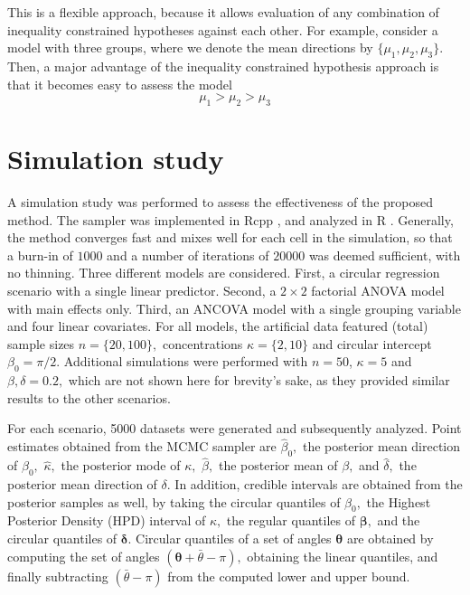 \documentclass[11pt,a4paper]{article}\usepackage[]{graphicx}\usepackage[]{color}
\newcommand{\bt}{\boldsymbol{\theta}}
\newcommand{\bdt}{\boldsymbol{\delta}}
\newcommand{\bbt}{\boldsymbol{\beta}}
\begin{document}
This is a flexible approach, because it allows evaluation of any combination of inequality constrained hypotheses against each other. For example, consider a model with three groups, where we denote the mean directions by \( \{ \mu_1, \mu_2, \mu_3 \} \). Then, a major advantage of the inequality constrained hypothesis approach is that it becomes easy to assess the model
\begin{equation}
\mu_1 > \mu_2 > \mu_3
\end{equation}

\section{Simulation study}

\label{sim}

A simulation study was performed to assess the effectiveness of the proposed method. The sampler was implemented in Rcpp \citep{rcpp}, and analyzed in R \citep{r2016}.  Generally, the method converges fast and mixes well for each cell in the simulation, so that a burn-in of \(1000\) and a number of iterations of \( 20000 \) was deemed sufficient, with no thinning.
Three different models are considered. First, a circular regression scenario with a single linear predictor. Second, a \( 2 \times 2 \) factorial ANOVA model with main effects only. Third, an ANCOVA model with a single grouping variable and four linear covariates.  For all models, the artificial data featured (total) sample sizes \( n = \{ 20, 100 \},\) concentrations \( \kappa = \{ 2, 10 \}\) and circular intercept \( \beta_0 = \pi/2.\) Additional simulations were performed with \( n = 50 \), \( \kappa = 5 \) and \( \beta, \delta = 0.2,\) which are not shown here for brevity's sake, as they provided similar results to the other scenarios.

For each scenario, 5000 datasets were generated and subsequently analyzed. Point estimates obtained from the MCMC sampler are \( \hat{\beta}_0,\) the posterior mean direction of \(\beta_0, \) \( \hat{\kappa},\) the posterior mode of \( \kappa,\) \( \hat{\beta},\) the posterior mean of \( \beta,\) and \( \hat{\delta},\) the posterior mean direction of \( \delta.\) In addition, credible intervals are obtained from the posterior samples as well, by taking the circular quantiles of \(\beta_0, \) the Highest Posterior Density (HPD) interval of \( \kappa,\) the regular quantiles of \( \bbt,\) and the circular quantiles of \( \bdt.\) Circular quantiles of a set of angles \( \bt \) are obtained by computing the set of angles \( (\bt + \bar\theta - \pi),\) obtaining the linear quantiles, and finally subtracting \( (\bar\theta - \pi) \) from the computed lower and upper bound.
\end{document}
